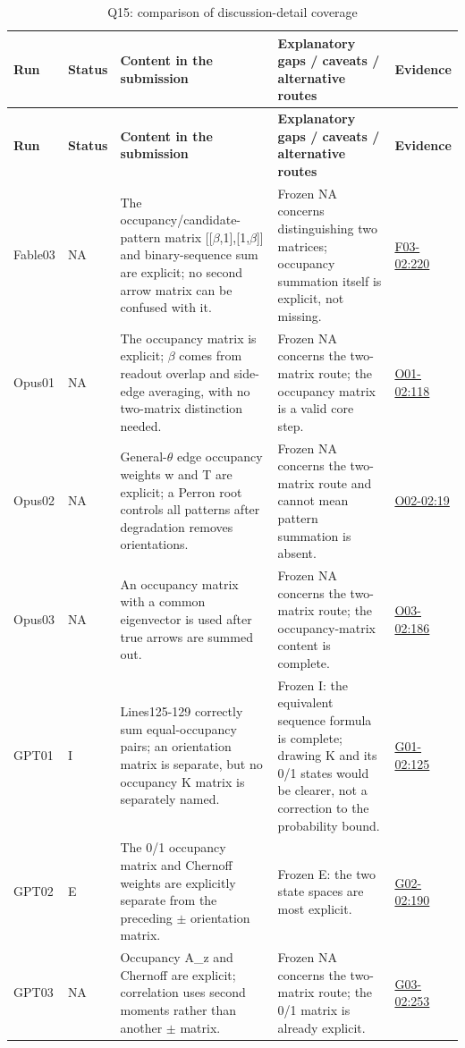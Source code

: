 \documentclass[11pt,a4paper]{article}
\begin{document}
{\fontsize{9.0}{12.6}\selectfont
\setlength{\tabcolsep}{2.5pt}
\begin{longtable}{>{\raggedright\arraybackslash}p{}>{\raggedright\arraybackslash}p{}>{\raggedright\arraybackslash}p{}>{\raggedright\arraybackslash}p{}>{\raggedright\arraybackslash}p{}}
\caption{Q15: comparison of discussion-detail coverage}\\
\toprule
\textbf{Run} & \textbf{Status} & \textbf{Content in the submission} & \textbf{Explanatory gaps /\allowbreak{} caveats /\allowbreak{} alternative routes} & \textbf{Evidence}\tabularnewline
\midrule
\endfirsthead
\toprule
\textbf{Run} & \textbf{Status} & \textbf{Content in the submission} & \textbf{Explanatory gaps /\allowbreak{} caveats /\allowbreak{} alternative routes} & \textbf{Evidence}\tabularnewline
\midrule
\endhead
{}Fable03 & NA & The occupancy/\allowbreak{}candidate-pattern matrix [[\ensuremath{\beta},\allowbreak{}1],\allowbreak{}[1,\allowbreak{}\ensuremath{\beta}]] and binary-sequence sum are explicit; no second arrow matrix can be confused with it. & Frozen NA concerns distinguishing two matrices; occupancy summation itself is explicit,\allowbreak{} not missing. & \hyperref[src:F03-02]{F03-02:220}\tabularnewline
{}Opus01 & NA & The occupancy matrix is explicit; \ensuremath{\beta} comes from readout overlap and side-edge averaging,\allowbreak{} with no two-matrix distinction needed. & Frozen NA concerns the two-matrix route; the occupancy matrix is a valid core step. & \hyperref[src:O01-02]{O01-02:118}\tabularnewline
{}Opus02 & NA & General-\ensuremath{\theta} edge occupancy weights w and T are explicit; a Perron root controls all patterns after degradation removes orientations. & Frozen NA concerns the two-matrix route and cannot mean pattern summation is absent. & \hyperref[src:O02-02]{O02-02:19}\tabularnewline
{}Opus03 & NA & An occupancy matrix with a common eigenvector is used after true arrows are summed out. & Frozen NA concerns the two-matrix route; the occupancy-matrix content is complete. & \hyperref[src:O03-02]{O03-02:186}\tabularnewline
{}GPT01 & I & Lines125-129 correctly sum equal-occupancy pairs; an orientation matrix is separate,\allowbreak{} but no occupancy K matrix is separately named. & Frozen I: the equivalent sequence formula is complete; drawing K and its 0/\allowbreak{}1 states would be clearer,\allowbreak{} not a correction to the probability bound. & \hyperref[src:G01-02]{G01-02:125}\tabularnewline
{}GPT02 & E & The 0/\allowbreak{}1 occupancy matrix and Chernoff weights are explicitly separate from the preceding \ensuremath{\pm} orientation matrix. & Frozen E: the two state spaces are most explicit. & \hyperref[src:G02-02]{G02-02:190}\tabularnewline
{}GPT03 & NA & Occupancy A\_z and Chernoff are explicit; correlation uses second moments rather than another \ensuremath{\pm} matrix. & Frozen NA concerns the two-matrix route; the 0/\allowbreak{}1 matrix is already explicit. & \hyperref[src:G03-02]{G03-02:253}\tabularnewline
\bottomrule
\end{longtable}
}
\end{document}
